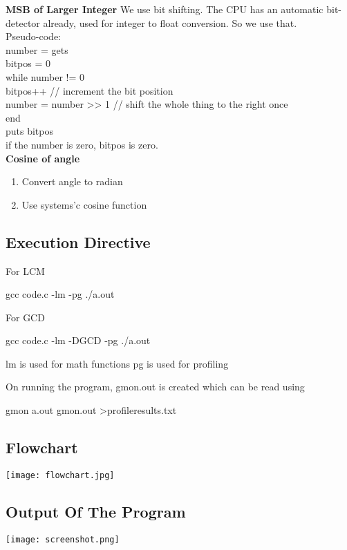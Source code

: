 \documentclass[paper=a4, fontsize=11pt]{scrartcl} %
\numberwithin{equation}{section} %
\numberwithin{figure}{section} %
\numberwithin{table}{section} %
\begin{document}
\textbf{MSB of Larger Integer}
We use bit shifting. The CPU has an automatic bit-detector already, used for integer to float conversion. So we use that.\\

Pseudo-code:\\

number = gets\\
bitpos = 0\\
while number != 0\\
  bitpos++            // increment the bit position\\
  number = number >> 1 // shift the whole thing to the right once\\
end\\
puts bitpos\\
if the number is zero, bitpos is zero.\\

\textbf{Cosine of angle}
\begin{enumerate}
\item Convert angle to radian
\item Use systems'c cosine function
\end{enumerate}


\subsection{Execution Directive}
For LCM

gcc code.c -lm -pg
./a.out 

For GCD

gcc code.c -lm -DGCD -pg
./a.out 

lm is used for math functions
pg is used for profiling 

On running the program, gmon.out is created which can be read using

gmon a.out gmon.out >profileresults.txt

\subsection{Flowchart}
\texttt{[image: flowchart.jpg]}\\

\subsection{Output Of The Program}
\texttt{[image: screenshot.png]}\\
\end{document}
